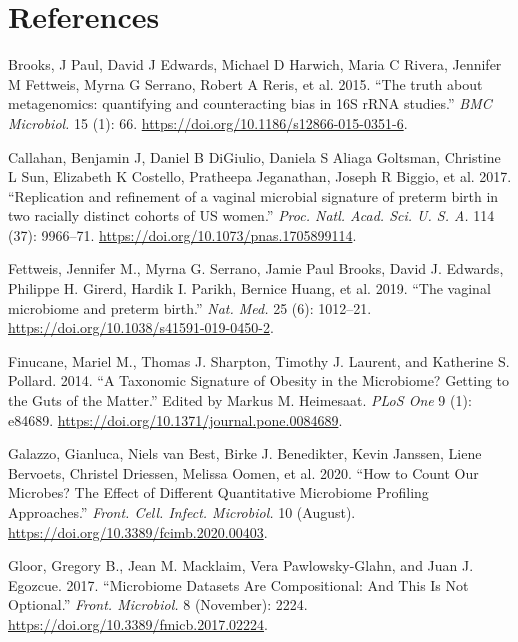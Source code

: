 \documentclass[
]{article}
\newlength{\cslhangindent}
\newlength{\cslentryspacingunit} %
\newenvironment{CSLReferences}[2] %
 {%
  \setlength{\parindent}{0pt}
  \ifodd #1
  \let\oldpar\par
  \def\par{\hangindent=\cslhangindent\oldpar}
  \fi
  \setlength{\parskip}{#2\cslentryspacingunit}
 }%
 {}
\theoremstyle{definition}
\theoremstyle{definition}
\theoremstyle{definition}
\theoremstyle{definition}
\theoremstyle{remark}
\begin{document}
\hypertarget{references}{%
\section*{References}\label{references}}

\hypertarget{refs}{}
\begin{CSLReferences}{1}{0}
\leavevmode{}%
Brooks, J Paul, David J Edwards, Michael D Harwich, Maria C Rivera, Jennifer M Fettweis, Myrna G Serrano, Robert A Reris, et al. 2015. {``{The truth about metagenomics: quantifying and counteracting bias in 16S rRNA studies}.''} \emph{BMC Microbiol.} 15 (1): 66. \url{https://doi.org/10.1186/s12866-015-0351-6}.

\leavevmode{}%
Callahan, Benjamin J, Daniel B DiGiulio, Daniela S Aliaga Goltsman, Christine L Sun, Elizabeth K Costello, Pratheepa Jeganathan, Joseph R Biggio, et al. 2017. {``{Replication and refinement of a vaginal microbial signature of preterm birth in two racially distinct cohorts of US women}.''} \emph{Proc. Natl. Acad. Sci. U. S. A.} 114 (37): 9966--71. \url{https://doi.org/10.1073/pnas.1705899114}.

\leavevmode{}%
Fettweis, Jennifer M., Myrna G. Serrano, Jamie Paul Brooks, David J. Edwards, Philippe H. Girerd, Hardik I. Parikh, Bernice Huang, et al. 2019. {``{The vaginal microbiome and preterm birth}.''} \emph{Nat. Med.} 25 (6): 1012--21. \url{https://doi.org/10.1038/s41591-019-0450-2}.

\leavevmode{}%
Finucane, Mariel M., Thomas J. Sharpton, Timothy J. Laurent, and Katherine S. Pollard. 2014. {``{A Taxonomic Signature of Obesity in the Microbiome? Getting to the Guts of the Matter}.''} Edited by Markus M. Heimesaat. \emph{PLoS One} 9 (1): e84689. \url{https://doi.org/10.1371/journal.pone.0084689}.

\leavevmode{}%
Galazzo, Gianluca, Niels van Best, Birke J. Benedikter, Kevin Janssen, Liene Bervoets, Christel Driessen, Melissa Oomen, et al. 2020. {``{How to Count Our Microbes? The Effect of Different Quantitative Microbiome Profiling Approaches}.''} \emph{Front. Cell. Infect. Microbiol.} 10 (August). \url{https://doi.org/10.3389/fcimb.2020.00403}.

\leavevmode{}%
Gloor, Gregory B., Jean M. Macklaim, Vera Pawlowsky-Glahn, and Juan J. Egozcue. 2017. {``{Microbiome Datasets Are Compositional: And This Is Not Optional}.''} \emph{Front. Microbiol.} 8 (November): 2224. \url{https://doi.org/10.3389/fmicb.2017.02224}.


\end{CSLReferences}
\end{document}

